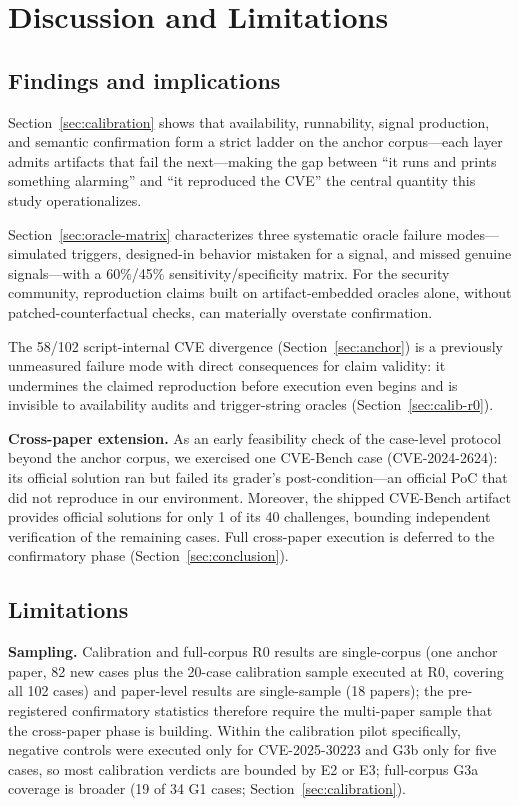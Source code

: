 \documentclass[11pt]{article}
\begin{document}
\section{Discussion and Limitations}
\label{sec:discussion}

\subsection{Findings and implications}
Section~\ref{sec:calibration} shows that availability, runnability, signal production, and semantic confirmation form a strict ladder on the anchor corpus---each layer admits artifacts that fail the next---making the gap between ``it runs and prints something alarming'' and ``it reproduced the CVE'' the central quantity this study operationalizes.

Section~\ref{sec:oracle-matrix} characterizes three systematic oracle failure modes---simulated triggers, designed-in behavior mistaken for a signal, and missed genuine signals---with a 60\%/45\% sensitivity/specificity matrix. For the security community, reproduction claims built on artifact-embedded oracles alone, without patched-counterfactual checks, can materially overstate confirmation.

The 58/102 script-internal CVE divergence (Section~\ref{sec:anchor}) is a previously unmeasured failure mode with direct consequences for claim validity: it undermines the claimed reproduction before execution even begins and is invisible to availability audits and trigger-string oracles (Section~\ref{sec:calib-r0}).

\textbf{Cross-paper extension.} As an early feasibility check of the case-level protocol beyond the anchor corpus, we exercised one CVE-Bench case (CVE-2024-2624): its official solution ran but failed its grader's post-condition---an official PoC that did not reproduce in our environment. Moreover, the shipped CVE-Bench artifact provides official solutions for only 1 of its 40 challenges, bounding independent verification of the remaining cases. Full cross-paper execution is deferred to the confirmatory phase (Section~\ref{sec:conclusion}).

\subsection{Limitations}
\textbf{Sampling.} Calibration and full-corpus R0 results are single-corpus (one anchor paper, 82 new cases plus the 20-case calibration sample executed at R0, covering all 102 cases) and paper-level results are single-sample (18 papers); the pre-registered confirmatory statistics therefore require the multi-paper sample that the cross-paper phase is building. Within the calibration pilot specifically, negative controls were executed only for CVE-2025-30223 and G3b only for five cases, so most calibration verdicts are bounded by E2 or E3; full-corpus G3a coverage is broader (19 of 34 G1 cases; Section~\ref{sec:calibration}).
\end{document}
